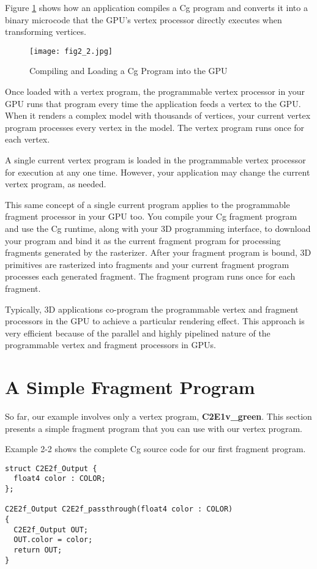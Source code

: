 \documentclass[../main.tex]{subfiles}
\begin{document}
Figure \ref{fig:2-2} shows how an application compiles a Cg program and converts it into a binary microcode that the GPU's vertex processor directly executes when transforming vertices.

\begin{figure}
    \centering
    \texttt{[image: fig2\_2.jpg]}
    \caption{Compiling and Loading a Cg Program into the GPU}
    \label{fig:2-2}
\end{figure}

Once loaded with a vertex program, the programmable vertex processor in your GPU runs that program every time the application feeds a vertex to the GPU. When it renders a complex model with thousands of vertices, your current vertex program processes every vertex in the model. The vertex program runs once for each vertex.

A single current vertex program is loaded in the programmable vertex processor for execution at any one time. However, your application may change the current vertex program, as needed.

This same concept of a single current program applies to the programmable fragment processor in your GPU too. You compile your Cg fragment program and use the Cg runtime, along with your 3D programming interface, to download your program and bind it as the current fragment program for processing fragments generated by the rasterizer. After your fragment program is bound, 3D primitives are rasterized into fragments and your current fragment program processes each generated fragment. The fragment program runs once for each fragment.

Typically, 3D applications co-program the programmable vertex and fragment processors in the GPU to achieve a particular rendering effect. This approach is very efficient because of the parallel and highly pipelined nature of the programmable vertex and fragment processors in GPUs.

\section{A Simple Fragment Program}

So far, our example involves only a vertex program, \textbf{C2E1v_green}. This section presents a simple fragment program that you can use with our vertex program.

Example 2-2 shows the complete Cg source code for our first fragment program.

\FloatBarrier
\begin{lstlisting}[caption=Example 2-2. The \textbf{C2E2f_passthrough} Fragment Program]
struct C2E2f_Output {
  float4 color : COLOR;
};

C2E2f_Output C2E2f_passthrough(float4 color : COLOR)
{
  C2E2f_Output OUT;
  OUT.color = color;
  return OUT;
}
\end{lstlisting}
\FloatBarrier
\end{document}
